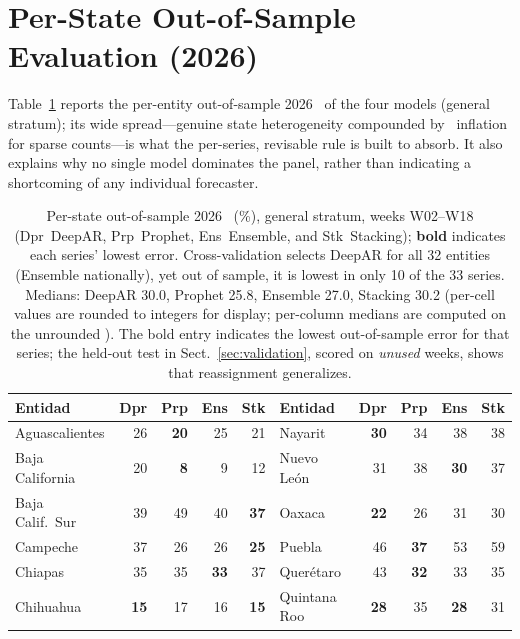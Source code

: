 \section{Per-State Out-of-Sample Evaluation (2026)}
\label{app:perstate}
Table~\ref{tab:perstate} reports the per-entity out-of-sample 2026
\smape\ of the four models (general stratum); its wide spread---genuine
state heterogeneity compounded by \smape\ inflation for sparse
counts---is what the per-series, revisable rule is built to absorb. It
also explains why no single model dominates the panel, rather than
indicating a shortcoming of any individual forecaster.

\begin{table}[t]
\centering
\caption{Per-state out-of-sample 2026 \smape\ (\%), general stratum,
weeks W02--W18 (Dpr~DeepAR, Prp~Prophet, Ens~Ensemble, and Stk~Stacking);
\textbf{bold} indicates each series' lowest error. Cross-validation
selects DeepAR for all 32 entities (Ensemble nationally), yet out of
sample, it is lowest in only 10 of the 33 series. Medians: DeepAR
30.0, Prophet 25.8, Ensemble 27.0, Stacking 30.2 (per-cell values are rounded to integers for display; per-column medians are computed on the unrounded \smape). The bold entry
indicates the lowest out-of-sample error for that series; the held-out
test in Sect.~\ref{sec:validation}, scored on \emph{unused} weeks,
shows that reassignment generalizes.}
\label{tab:perstate}
\setlength{\tabcolsep}{4pt}
\renewcommand{\arraystretch}{1.05}
\footnotesize
\begin{tabular}{l rrrr @{\hskip 5mm} l rrrr}
\toprule
\textbf{Entidad} & \textbf{Dpr} & \textbf{Prp} & \textbf{Ens} & \textbf{Stk} & \textbf{Entidad} & \textbf{Dpr} & \textbf{Prp} & \textbf{Ens} & \textbf{Stk}\\
\midrule
Aguascalientes & 26 & \textbf{20} & 25 & 21 & Nayarit & \textbf{30} & 34 & 38 & 38\\
Baja California & 20 & \textbf{8} & 9 & 12 & Nuevo Le\'on & 31 & 38 & \textbf{30} & 37\\
Baja Calif.\ Sur & 39 & 49 & 40 & \textbf{37} & Oaxaca & \textbf{22} & 26 & 31 & 30\\
Campeche & 37 & 26 & 26 & \textbf{25} & Puebla & 46 & \textbf{37} & 53 & 59\\
Chiapas & 35 & 35 & \textbf{33} & 37 & Quer\'etaro & 43 & \textbf{32} & 33 & 35\\
Chihuahua & \textbf{15} & 17 & 16 & \textbf{15} & Quintana Roo & \textbf{28} & 35 & \textbf{28} & 31\\

\end{tabular}
\end{table}
